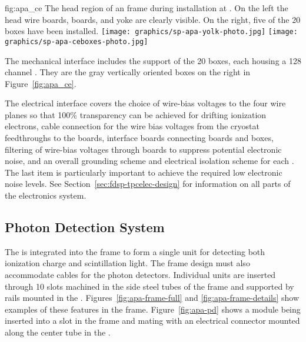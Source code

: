 \begin{dunefigure}{fig:apa_ce}
{The head region of an  frame during installation at .  On the left the head wire boards,  boards, and yoke are clearly visible. On the right, five of the 20  boxes have been installed.}
\texttt{[image: graphics/sp-apa-yolk-photo.jpg]}
\texttt{[image: graphics/sp-apa-ceboxes-photo.jpg]}
\end{dunefigure}

The mechanical interface includes the support of the \num{20}  boxes, each housing a \num{128} channel .  They are the gray vertically oriented boxes  on the right in Figure~\ref{fig:apa_ce}. 

The electrical interface covers the choice of wire-bias voltages to the four wire planes so that \num{100}\% transparency can be achieved for drifting ionization electrons, cable connection for the wire bias voltages from the cryostat feedthroughs to the  boards, interface boards connecting  boards and  boxes, filtering of wire-bias voltages through  boards to suppress potential electronic noise, and an overall grounding scheme and electrical isolation scheme for each . The last item is particularly important to achieve the required low electronic noise levels.  See Section~\ref{sec:fdsp-tpcelec-design} %
for information on all parts of the  electronics system.


\subsection{Photon Detection System}
\label{sec:fdsp-apa-intfc-pds}

The  is integrated into the  frame to form a single unit for detecting both ionization charge and scintillation light.  The  frame design must also accommodate cables for the photon detectors.  %
Individual  units are inserted through \num{10} slots machined in the side steel tubes of the frame and supported by rails mounted in the . Figures~\ref{fig:apa-frame-full} and \ref{fig:apa-frame-details} show examples of these features in the frame. Figure~\ref{fig:apa-pd} shows a  module being inserted into a slot in the frame and mating with an electrical connector mounted along the center tube in the .

